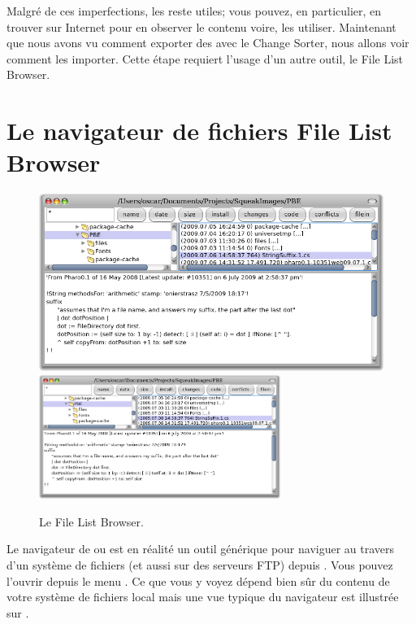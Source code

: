 \documentclass[a4paper,10pt,twoside]{book}
\begin{document}
Malgré de ces imperfections, les \changesets reste utiles; vous pouvez, en particulier, en trouver sur Internet pour en observer le contenu voire, les utiliser.
Maintenant que nous avons vu comment exporter des \changesets avec le Change Sorter,
nous allons voir comment les importer.
Cette étape requiert l'usage d'un autre outil, le File List Browser.

\section{Le navigateur de fichiers File List Browser}

\begin{figure}[btp]
	\begin{center}
	\ifluluelse
		{\includegraphics[width=\textwidth]{fileList}}
		{\includegraphics[width=0.7\textwidth]{fileList}}
	\end{center}
	\caption{Le File List Browser.}
\end{figure}

Le navigateur de  ou  est
en réalité un outil générique pour naviguer au travers d'un système de fichiers
(et aussi sur des serveurs FTP) depuis \pharo.
Vous pouvez l'ouvrir depuis le menu . %
Ce que vous y voyez dépend bien sûr du contenu de votre système de fichiers local
mais une vue typique du navigateur est illustrée sur 
.
\end{document}
